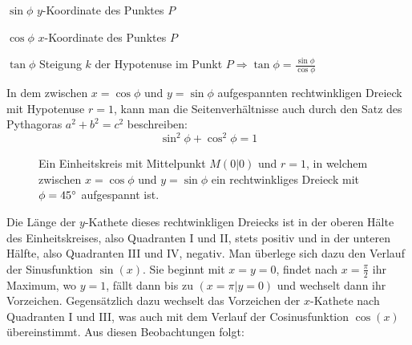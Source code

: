 $\sin \phi$  $y$-Koordinate des Punktes $P$

$\cos \phi$  $x$-Koordinate des Punktes $P$

$\tan \phi$  Steigung $k$ der Hypotenuse im Punkt $P \Rightarrow \tan \phi = \frac{\sin \phi}{\cos \phi}$

In dem zwischen $x = \cos \phi$ und $y = \sin \phi$ aufgespannten rechtwinkligen Dreieck mit Hypotenuse $r = 1$, kann man die Seitenverh\"{a}ltnisse auch durch den Satz des Pythagoras $a^2 + b^2 = c^2$ beschreiben: $$\sin^2 \phi + \cos^2 \phi = 1$$

\pagebreak

\begin{figure}[t!]
\centering
	\caption*{Ein Einheitskreis mit Mittelpunkt $M (0 | 0)$ und $r = 1$, in welchem zwischen $x = \cos \phi$ und $y = \sin \phi$ ein rechtwinkliges Dreieck mit $\phi = 45\degree$ aufgespannt ist.}
\end{figure}

Die L\"{a}nge der $y$-Kathete dieses rechtwinkligen Dreiecks ist in der oberen H\"{a}lte des Einheitskreises, also Quadranten I und II, stets positiv und in der unteren H\"{a}lfte, also Quadranten III und IV, negativ. Man \"{u}berlege sich dazu den Verlauf der Sinusfunktion $\sin(x)$. Sie beginnt mit $x = y = 0$, findet nach $x = \frac{\pi}{2}$ ihr Maximum, wo $y = 1$, f\"{a}llt dann bis zu $(x = \pi | y = 0)$ und wechselt dann ihr Vorzeichen. Gegens\"{a}tzlich dazu wechselt das Vorzeichen der $x$-Kathete nach Quadranten I und III, was auch mit dem Verlauf der Cosinusfunktion $\cos(x)$ \"{u}bereinstimmt. Aus diesen Beobachtungen folgt:

